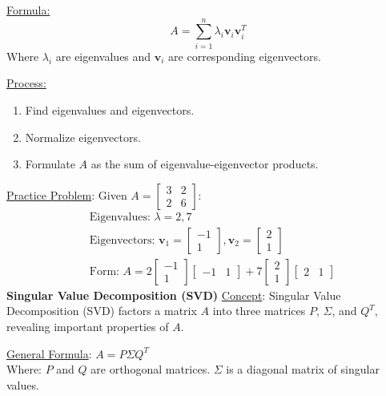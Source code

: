 \documentclass[8pt, a4paper, landscape]{extarticle} %
\begin{document}
\begin{multicols*}{4}
  \underline{Formula:}
  \[ A = \sum_{i=1}^n \lambda_i \mathbf{v}_i \mathbf{v}_i^T \]
  Where \( \lambda_i \) are eigenvalues and \( \mathbf{v}_i \) are corresponding eigenvectors.


  \underline{Process:}
  \begin{enumerate}
    \item Find eigenvalues and eigenvectors.
    \item Normalize eigenvectors.
    \item Formulate \( A \) as the sum of eigenvalue-eigenvector products.
  \end{enumerate}

  \underline{Practice Problem}:
  Given \( A = \begin{bmatrix} 3 & 2 \\ 2 & 6 \end{bmatrix} \):
  \[
    \begin{aligned}
       & \text{Eigenvalues: } \lambda = 2, 7                                                                                                                                         \\
       & \text{Eigenvectors: } \mathbf{v}_1 = \begin{bmatrix} -1 \\ 1 \end{bmatrix}, \mathbf{v}_2 = \begin{bmatrix} 2 \\ 1 \end{bmatrix}                                             \\
       & \text{Form: } A = 2 \begin{bmatrix} -1 \\ 1 \end{bmatrix} \begin{bmatrix} -1 & 1 \end{bmatrix} + 7 \begin{bmatrix} 2 \\ 1 \end{bmatrix} \begin{bmatrix} 2 & 1 \end{bmatrix}
    \end{aligned}
  \]
  \textbf{Singular Value Decomposition (SVD)}
  \underline{Concept}:
  Singular Value Decomposition (SVD) factors a matrix \( A \) into three matrices \( P \), \( \Sigma \), and \( Q^T \), revealing important properties of \( A \).

  \underline{General Formula}: \( A = P \Sigma Q^T \) \\
  Where: \( P \) and \( Q \) are orthogonal matrices. \( \Sigma \) is a diagonal matrix of singular values.


\end{multicols*}
\end{document}
